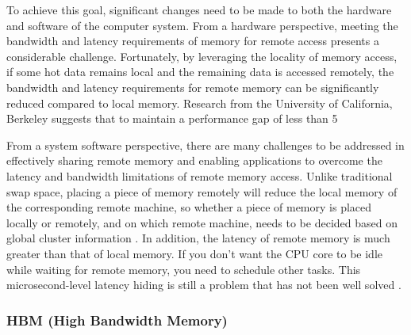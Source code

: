 To achieve this goal, significant changes need to be made to both the hardware and software of the computer system. From a hardware perspective, meeting the bandwidth and latency requirements of memory for remote access presents a considerable challenge. Fortunately, by leveraging the locality of memory access, if some hot data remains local and the remaining data is accessed remotely, the bandwidth and latency requirements for remote memory can be significantly reduced compared to local memory. Research from the University of California, Berkeley \cite{gao2016network} suggests that to maintain a performance gap of less than 5%

From a system software perspective, there are many challenges to be addressed in effectively sharing remote memory and enabling applications to overcome the latency and bandwidth limitations of remote memory access. Unlike traditional swap space, placing a piece of memory remotely will reduce the local memory of the corresponding remote machine, so whether a piece of memory is placed locally or remotely, and on which remote machine, needs to be decided based on global cluster information \cite{gu2017efficient}. In addition, the latency of remote memory is much greater than that of local memory. If you don't want the CPU core to be idle while waiting for remote memory, you need to schedule other tasks. This microsecond-level latency hiding is still a problem that has not been well solved \cite{barroso2017attack}.

\subsubsection{HBM (High Bandwidth Memory)}

